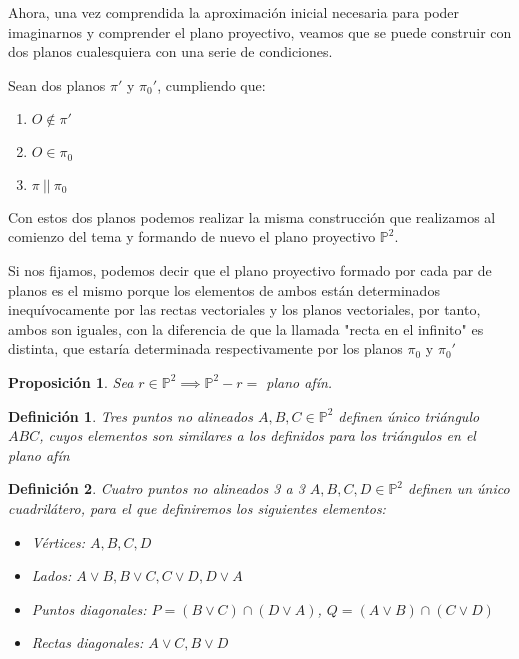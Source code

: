 \documentclass[11pt, a4paper]{article}
\newif\IfInSansMode
\theoremstyle{theorem-style}
\newtheorem{nprop}{Proposición}[section]
\theoremstyle{definition-style}
\newtheorem{ndef}{Definición}[section]
\theoremstyle{remark-style}
\theoremstyle{example-style}
\newenvironment{nlist}
{\begin{enumerate}
    \renewcommand\labelenumi{(\emph{\roman{enumi})}}}
  {\end{enumerate}}
\begin{document}
Ahora, una vez comprendida la aproximación inicial necesaria para poder imaginarnos y comprender el plano proyectivo, veamos que se puede construir con dos planos cualesquiera con una serie de condiciones.


Sean dos planos $\pi'$ y $\pi_0'$, cumpliendo que:
\begin{nlist}
	\item $O \notin \pi'$
	\item $O \in \pi_0$
	\item $\pi\ ||\ \pi_0$ 
\end{nlist}
Con estos dos planos podemos realizar la misma construcción que realizamos al comienzo del tema y formando de nuevo el plano proyectivo $\mathbb{P}^2$. 

Si nos fijamos, podemos decir que el plano proyectivo formado por cada par de planos es el mismo porque los elementos de ambos están determinados inequívocamente por las rectas vectoriales y los planos vectoriales, por tanto, ambos son iguales, con la diferencia de que la llamada "recta en el infinito" es distinta, que estaría determinada respectivamente por los planos $\pi_0$ y $\pi_0'$

\begin{nprop}
Sea $r \in \mathbb{P}^2 \implies \mathbb{P}^2 - r =$ plano afín.
\end{nprop}

\begin{ndef}
Tres puntos no alineados $A,B,C \in \mathbb{P}^2$ definen único triángulo $ABC$, cuyos elementos son similares a los definidos para los triángulos en el plano afín
\end{ndef}

\begin{ndef}
Cuatro puntos no alineados 3 a 3 $A,B,C,D \in \mathbb{P}^2$ definen un único cuadrilátero, para el que definiremos los siguientes elementos:
\begin{itemize}
	\item Vértices: $A, B, C, D$
	\item Lados: $A\vee B, B\vee C, C\vee D, D\vee A$
	\item Puntos diagonales: $P = (B\vee C) \cap (D\vee A)$, $Q = (A\vee B) \cap (C\vee D)$ 
	\item Rectas diagonales: $A\vee C, B\vee D$
\end{itemize} 
\end{ndef}
\end{document}
